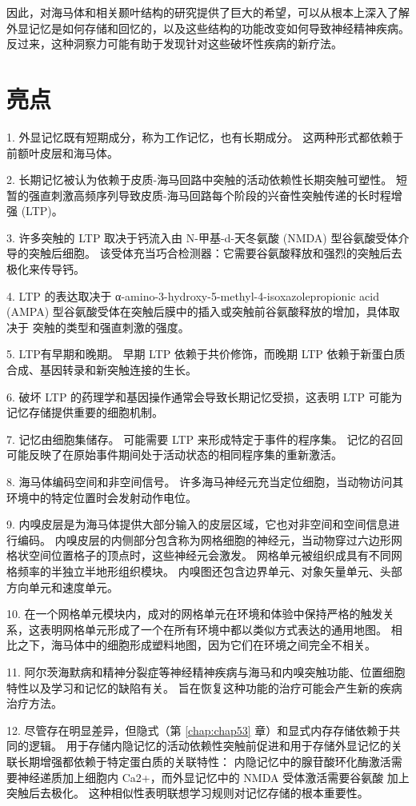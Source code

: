 因此，对海马体和相关颞叶结构的研究提供了巨大的希望，可以从根本上深入了解外显记忆是如何存储和回忆的，以及这些结构的功能改变如何导致神经精神疾病。
反过来，这种洞察力可能有助于发现针对这些破坏性疾病的新疗法。



\section{亮点}

1. 外显记忆既有短期成分，称为工作记忆，也有长期成分。
这两种形式都依赖于前额叶皮层和海马体。 


2. 长期记忆被认为依赖于皮质-海马回路中突触的活动依赖性长期突触可塑性。
短暂的强直刺激高频序列导致皮质-海马回路每个阶段的兴奋性突触传递的长时程增强 (LTP)。


3. 许多突触的 LTP 取决于钙流入由 N-甲基-d-天冬氨酸 (NMDA) 型谷氨酸受体介导的突触后细胞。
该受体充当巧合检测器：它需要谷氨酸释放和强烈的突触后去极化来传导钙。 


4. LTP 的表达取决于 α-amino-3-hydroxy-5-methyl-4-isoxazolepropionic acid (AMPA) 型谷氨酸受体在突触后膜中的插入或突触前谷氨酸释放的增加，具体取决于 突触的类型和强直刺激的强度。


5. LTP有早期和晚期。 早期 LTP 依赖于共价修饰，而晚期 LTP 依赖于新蛋白质合成、基因转录和新突触连接的生长。


6. 破坏 LTP 的药理学和基因操作通常会导致长期记忆受损，这表明 LTP 可能为记忆存储提供重要的细胞机制。


7. 记忆由细胞集储存。
可能需要 LTP 来形成特定于事件的程序集。
记忆的召回可能反映了在原始事件期间处于活动状态的相同程序集的重新激活。


8. 海马体编码空间和非空间信号。
许多海马神经元充当定位细胞，当动物访问其环境中的特定位置时会发射动作电位。


9. 内嗅皮层是为海马体提供大部分输入的皮层区域，它也对非空间和空间信息进行编码。
内嗅皮层的内侧部分包含称为网格细胞的神经元，当动物穿过六边形网格状空间位置格子的顶点时，这些神经元会激发。
网格单元被组织成具有不同网格频率的半独立半地形组织模块。
内嗅图还包含边界单元、对象矢量单元、头部方向单元和速度单元。


10. 在一个网格单元模块内，成对的网格单元在环境和体验中保持严格的触发关系，这表明网格单元形成了一个在所有环境中都以类似方式表达的通用地图。
相比之下，海马体中的细胞形成塑料地图，因为它们在环境之间完全不相关。


11. 阿尔茨海默病和精神分裂症等神经精神疾病与海马和内嗅突触功能、位置细胞特性以及学习和记忆的缺陷有关。
旨在恢复这种功能的治疗可能会产生新的疾病治疗方法。 


12. 尽管存在明显差异，但隐式（第 \ref{chap:chap53} 章）和显式内存存储依赖于共同的逻辑。
用于存储内隐记忆的活动依赖性突触前促进和用于存储外显记忆的关联长期增强都依赖于特定蛋白质的关联特性：
内隐记忆中的腺苷酸环化酶激活需要神经递质加上细胞内 Ca2+，而外显记忆中的 NMDA 受体激活需要谷氨酸 加上突触后去极化。
这种相似性表明联想学习规则对记忆存储的根本重要性。






